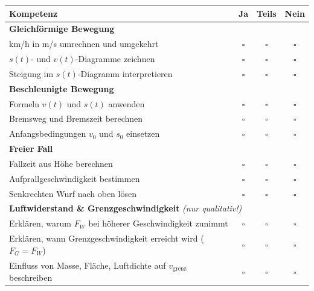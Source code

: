 \documentclass[11pt,a4paper]{article}
\begin{document}
\begin{tcolorbox}[colback=lightblue, colframe=physikblue, title=\textbf{Kann ich das? Ehrlich ankreuzen!}]
\begin{tabular}{|p{9cm}|c|c|c|}
\hline
\rowcolor{lightblue}
\textbf{Kompetenz} & \textbf{Ja} & \textbf{Teils} & \textbf{Nein} \\
\hline
\multicolumn{4}{|l|}{\textbf{Gleichförmige Bewegung}} \\
\hline
km/h in m/s umrechnen und umgekehrt & $\square$ & $\square$ & $\square$ \\
\hline
$s(t)$- und $v(t)$-Diagramme zeichnen & $\square$ & $\square$ & $\square$ \\
\hline
Steigung im $s(t)$-Diagramm interpretieren & $\square$ & $\square$ & $\square$ \\
\hline
\multicolumn{4}{|l|}{\textbf{Beschleunigte Bewegung}} \\
\hline
Formeln $v(t)$ und $s(t)$ anwenden & $\square$ & $\square$ & $\square$ \\
\hline
Bremsweg und Bremszeit berechnen & $\square$ & $\square$ & $\square$ \\
\hline
Anfangsbedingungen $v_0$ und $s_0$ einsetzen & $\square$ & $\square$ & $\square$ \\
\hline
\multicolumn{4}{|l|}{\textbf{Freier Fall}} \\
\hline
Fallzeit aus Höhe berechnen & $\square$ & $\square$ & $\square$ \\
\hline
Aufprallgeschwindigkeit bestimmen & $\square$ & $\square$ & $\square$ \\
\hline
Senkrechten Wurf nach oben lösen & $\square$ & $\square$ & $\square$ \\
\hline
\multicolumn{4}{|l|}{\textbf{Luftwiderstand \& Grenzgeschwindigkeit} \textit{(nur qualitativ!)}} \\
\hline
Erklären, warum $F_W$ bei höherer Geschwindigkeit zunimmt & $\square$ & $\square$ & $\square$ \\
\hline
Erklären, wann Grenzgeschwindigkeit erreicht wird ($F_G = F_W$) & $\square$ & $\square$ & $\square$ \\
\hline
Einfluss von Masse, Fläche, Luftdichte auf $v_{\text{grenz}}$ beschreiben & $\square$ & $\square$ & $\square$ \\
\hline
\end{tabular}
\end{tcolorbox}

\vspace{0.5cm}
\end{document}
